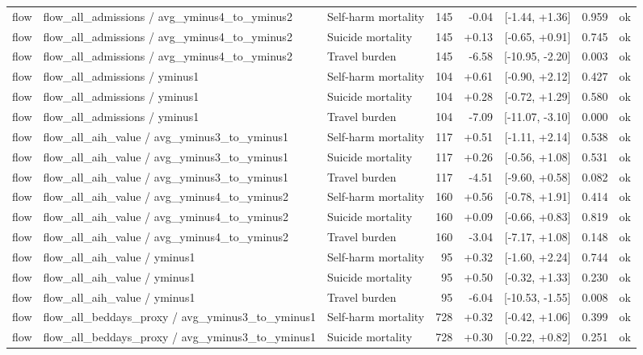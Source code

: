 \begin{table}[!htbp]
{\begin{tabular}{lllrrrrl}
flow & flow\_all\_admissions / avg\_yminus4\_to\_yminus2 & Self-harm mortality & 145 & -0.04 & [-1.44, +1.36] & 0.959 & ok \\
flow & flow\_all\_admissions / avg\_yminus4\_to\_yminus2 & Suicide mortality & 145 & +0.13 & [-0.65, +0.91] & 0.745 & ok \\
flow & flow\_all\_admissions / avg\_yminus4\_to\_yminus2 & Travel burden & 145 & -6.58 & [-10.95, -2.20] & 0.003 & ok \\
flow & flow\_all\_admissions / yminus1 & Self-harm mortality & 104 & +0.61 & [-0.90, +2.12] & 0.427 & ok \\
flow & flow\_all\_admissions / yminus1 & Suicide mortality & 104 & +0.28 & [-0.72, +1.29] & 0.580 & ok \\
flow & flow\_all\_admissions / yminus1 & Travel burden & 104 & -7.09 & [-11.07, -3.10] & 0.000 & ok \\
flow & flow\_all\_aih\_value / avg\_yminus3\_to\_yminus1 & Self-harm mortality & 117 & +0.51 & [-1.11, +2.14] & 0.538 & ok \\
flow & flow\_all\_aih\_value / avg\_yminus3\_to\_yminus1 & Suicide mortality & 117 & +0.26 & [-0.56, +1.08] & 0.531 & ok \\
flow & flow\_all\_aih\_value / avg\_yminus3\_to\_yminus1 & Travel burden & 117 & -4.51 & [-9.60, +0.58] & 0.082 & ok \\
flow & flow\_all\_aih\_value / avg\_yminus4\_to\_yminus2 & Self-harm mortality & 160 & +0.56 & [-0.78, +1.91] & 0.414 & ok \\
flow & flow\_all\_aih\_value / avg\_yminus4\_to\_yminus2 & Suicide mortality & 160 & +0.09 & [-0.66, +0.83] & 0.819 & ok \\
flow & flow\_all\_aih\_value / avg\_yminus4\_to\_yminus2 & Travel burden & 160 & -3.04 & [-7.17, +1.08] & 0.148 & ok \\
flow & flow\_all\_aih\_value / yminus1 & Self-harm mortality & 95 & +0.32 & [-1.60, +2.24] & 0.744 & ok \\
flow & flow\_all\_aih\_value / yminus1 & Suicide mortality & 95 & +0.50 & [-0.32, +1.33] & 0.230 & ok \\
flow & flow\_all\_aih\_value / yminus1 & Travel burden & 95 & -6.04 & [-10.53, -1.55] & 0.008 & ok \\
flow & flow\_all\_beddays\_proxy / avg\_yminus3\_to\_yminus1 & Self-harm mortality & 728 & +0.32 & [-0.42, +1.06] & 0.399 & ok \\
flow & flow\_all\_beddays\_proxy / avg\_yminus3\_to\_yminus1 & Suicide mortality & 728 & +0.30 & [-0.22, +0.82] & 0.251 & ok \\

\end{tabular}}
\end{table}
